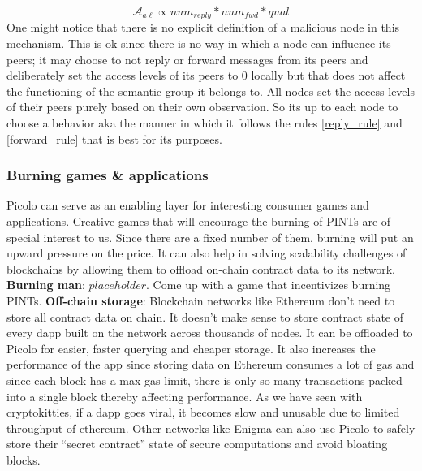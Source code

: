 \newline
$$ \mathcal{A}_{a\ell} \propto num_{reply} * num_{fwd} * qual$$
One might notice that there is no explicit definition of a malicious node in this mechanism. This is ok since there is no way in which a node can influence its peers; it may choose to not reply or forward messages from its peers and deliberately set the access levels of its peers to 0 locally but that does not affect the functioning of the semantic group it belongs to. All nodes set the access levels of their peers purely based on their own observation. So its up to each node to choose a behavior aka the manner in which it follows the rules \ref{reply_rule} and \ref{forward_rule} that is best for its purposes.

\subsubsection{Burning games \& applications}
Picolo can serve as an enabling layer for interesting consumer games and applications. Creative games that will encourage the burning of PINTs are of special interest to us. Since there are a fixed number of them, burning will put an upward pressure on the price. It can also help in solving scalability challenges of blockchains by allowing them to offload on-chain contract data to its network. 
\newline\newline
\textbf{Burning man}: $placeholder$. Come up with a game that incentivizes burning PINTs.
\newline\newline
\textbf{Off-chain storage}: Blockchain networks like Ethereum don't need to store all contract data on chain. It doesn't make sense to store contract state of every dapp built on the network across thousands of nodes. It can be offloaded to Picolo for easier, faster querying and cheaper storage. It also increases the performance of the app since storing data on Ethereum consumes a lot of gas and since each block has a max gas limit, there is only so many transactions packed into a single block thereby affecting performance. As we have seen with cryptokitties, if a dapp goes viral, it becomes slow and unusable due to limited throughput of ethereum. Other networks like Enigma \cite{enigma} can also use Picolo to safely store their ``secret contract'' state of secure computations and avoid bloating blocks.
\newline\newline
